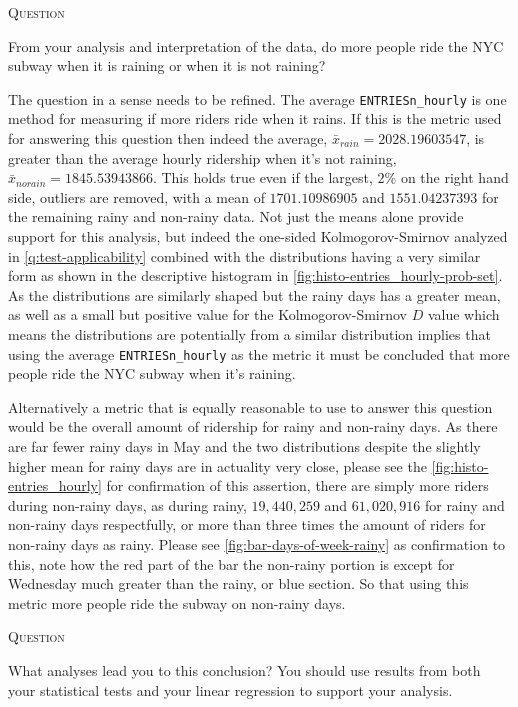 \documentclass{article}
\newcounter{questionCtr}
\newenvironment{question}{%
   \bigskip\noindent%
   \refstepcounter{questionCtr}%
   \textsc{Question \thequestionCtr}%
   \newline%
   }{\par\bigskip}  %
\numberwithin{questionCtr}{section}
\numberwithin{problemCtr}{section}
\begin{document}
\begin{question}
 From your analysis and interpretation of the data, do more people ride
 the NYC subway when it is raining or when it is not raining?
\end{question}
The question in a sense needs to be refined.  The average
\verb|ENTRIESn_hourly| is one method for measuring if more riders ride when it
rains.  If this is the metric used for answering this question then indeed the
average, $\bar{x}_{rain} = 2028.19603547$, is greater than the average hourly
ridership when it's not raining, $\bar{x}_{norain} = 1845.53943866$.  This holds
true even if the largest, $2\%$ on the right hand side, outliers are removed,
with a mean of $1701.10986905$ and $1551.04237393$ for the remaining rainy and
non-rainy data.  Not just the means alone provide support for this analysis, but
indeed the one-sided Kolmogorov-Smirnov analyzed in
\autoref{q:test-applicability} combined with the distributions having a very
similar form as shown in the descriptive histogram in
\autoref{fig:histo-entries_hourly-prob-set}.  As the distributions are similarly
shaped but the rainy days has a greater mean, as well as a small but positive
value for the Kolmogorov-Smirnov $D$ value which means the distributions are
potentially from a similar distribution implies that using the average
\verb|ENTRIESn_hourly| as the metric it must be concluded that more people ride
the NYC subway when it's raining.

Alternatively a metric that is equally reasonable to use to answer this question
would be the overall amount of ridership for rainy and non-rainy days.  As there
are far fewer rainy days in May and the two distributions despite the slightly
higher mean for rainy days are in actuality very close, please see the
\autoref{fig:histo-entries_hourly} for confirmation of this assertion, there are
simply more riders during non-rainy days, as during rainy, $19,440,259$ and
$61,020,916$ for rainy and non-rainy days respectfully, or more than three times
the amount of riders for non-rainy days as rainy.  Please see
\autoref{fig:bar-days-of-week-rainy} as confirmation to this, note how the red
part of the bar the non-rainy portion is except for Wednesday much greater than
the rainy, or blue section.  So that using this metric more people ride the
subway on non-rainy days.

\begin{question}
  What analyses lead you to this conclusion? You should use results from both
  your statistical tests and your linear regression to support your analysis.
\end{question}
\end{document}
